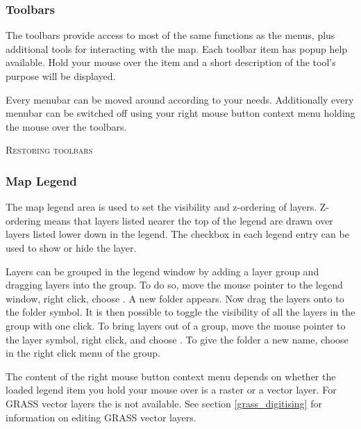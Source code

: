 
\subsubsection{Toolbars}\label{label_toolbars}

The toolbars provide access to most of the same functions as the menus,
plus additional tools for interacting with the map. Each toolbar item has
popup help available. Hold your mouse over the item and a short description of
the tool's purpose will be displayed. 

Every menubar can be moved around according to your needs. Additionally every
menubar can be switched off using your right mouse button context menu holding
the mouse over the toolbars.

\begin{Tip}
\caption{\textsc{Restoring toolbars}} 
\end{Tip}

\subsubsection{Map Legend}\label{label_legend}

The map legend area is used to set the visibility and z-ordering of layers.
Z-ordering means that layers listed nearer the top of the legend are drawn
over layers listed lower down in the legend. The checkbox in each legend
entry can be used to show or hide the layer.

Layers can be grouped in the legend window by adding a layer group and dragging layers 
into the group. To do so, move the mouse pointer to the legend window, right click, choose . 
A new folder appears. Now drag the layers onto to the folder symbol. It is then possible to toggle the 
visibility of all the layers in the group with one click. To bring layers out of a group, move 
the mouse pointer to the layer symbol, right click, and choose . To give the folder a 
new name, choose  in the right click menu of the group.

The content of the right mouse button context menu depends on whether the loaded legend item you hold your 
mouse over is a raster or a vector layer. For GRASS vector layers the  is not 
available. See section \ref{grass_digitising} for information on editing GRASS vector layers. 

